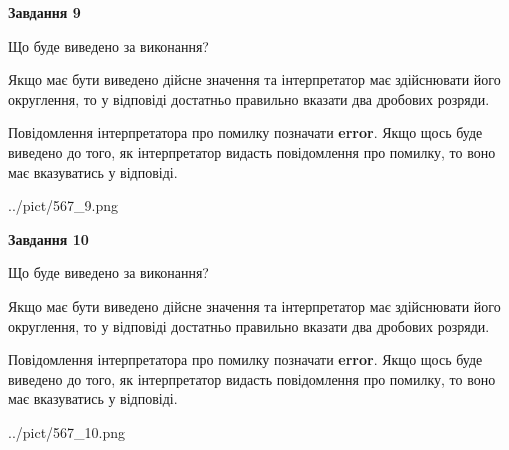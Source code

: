 \documentclass[12pt, ukrainian]{article}
\begin{document}
{\begin {Large}
{\begin {center}\textbf{Завдання 9}\end {center}}\par
Що буде виведено за виконання? \par

Якщо має бути виведено дійсне значення та інтерпретатор має здійснювати його округлення, 
то у відповіді достатньо правильно вказати два дробових розряди.

Повідомлення інтерпретатора про помилку позначати \textbf{error}.
Якщо щось буде виведено до того, як інтерпретатор видасть повідомлення про помилку, 
то воно має вказуватись у відповіді. \par

\begin{center}
	{../pict/567_9.png}
\end{center}
\newpage

{\begin {center}\textbf{Завдання 10}\end {center}}\par
Що буде виведено за виконання? \par

Якщо має бути виведено дійсне значення та інтерпретатор має здійснювати його округлення, 
то у відповіді достатньо правильно вказати два дробових розряди.

Повідомлення інтерпретатора про помилку позначати \textbf{error}.
Якщо щось буде виведено до того, як інтерпретатор видасть повідомлення про помилку, 
то воно має вказуватись у відповіді. \par

\begin{center}
	{../pict/567_10.png}
\end{center}
\newpage

\end {Large}}
\end{document}
